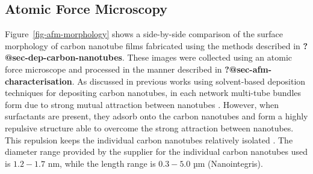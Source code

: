 \documentclass[
  a4paper,
]{scrbook}
\begin{document}
\hypertarget{sec-pristine-AFM}{%
\subsection{Atomic Force Microscopy}\label{sec-pristine-AFM}}

Figure~\ref{fig-afm-morphology} shows a side-by-side comparison of the
surface morphology of carbon nanotube films fabricated using the methods
described in \textbf{?@sec-dep-carbon-nanotubes}. These images were
collected using an atomic force microscope and processed in the manner
described in \textbf{?@sec-afm-characterisation}. As discussed in
previous works using solvent-based deposition techniques for depositing
carbon nanotubes, in each network multi-tube bundles form due to strong
mutual attraction between nanotubes
\autocite{Zheng2017,Murugathas2018,Murugathas2019,Nguyen2021}. However,
when surfactants are present, they adsorb onto the carbon nanotubes and
form a highly repulsive structure able to overcome the strong attraction
between nanotubes. This repulsion keeps the individual carbon nanotubes
relatively isolated
\autocite{Wenseleers2004,Gavrel2013,Hermanson2013-16,Shimizu2013,DiCrescenzo2014,Yang2023}.
The diameter range provided by the supplier for the individual carbon
nanotubes used is \(1.2-1.7\) nm, while the length range is \(0.3-5.0\)
µm (Nanointegris).
\end{document}
